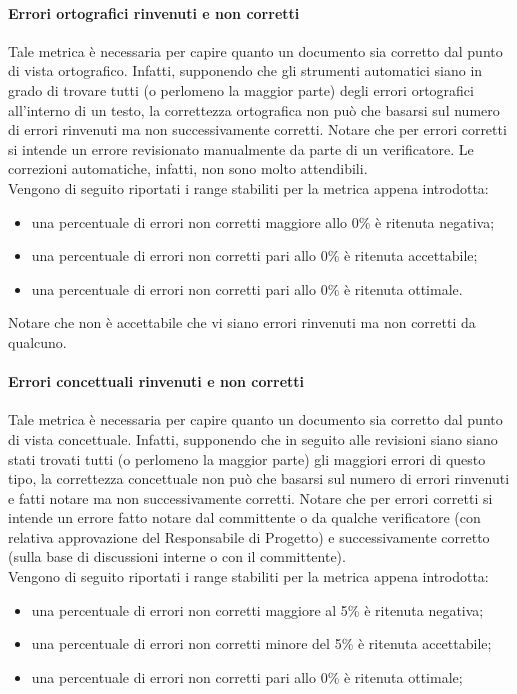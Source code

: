 \documentclass[../PianoDiQualifica.tex]{subfiles}
\begin{document}
				\paragraph{Errori ortografici rinvenuti e non corretti}
				Tale metrica è necessaria per capire quanto un documento sia corretto dal punto di vista ortografico. Infatti, supponendo che gli strumenti automatici siano in grado di trovare tutti (o perlomeno la maggior parte) degli errori ortografici all'interno di un testo, la correttezza ortografica non può che basarsi sul numero di errori rinvenuti ma non successivamente corretti. Notare che per errori corretti si intende un errore revisionato manualmente da parte di un verificatore. Le correzioni automatiche, infatti, non sono molto attendibili. \\
				Vengono di seguito riportati i range stabiliti per la metrica appena introdotta:
				\begin{itemize}
					\item una percentuale di errori non corretti maggiore allo 0\% è ritenuta negativa;
					\item una percentuale di errori non corretti pari allo 0\% è ritenuta accettabile;
					\item una percentuale di errori non corretti pari allo 0\% è ritenuta ottimale.
				\end{itemize}
				Notare che non è accettabile che vi siano errori rinvenuti ma non corretti da qualcuno.
				\paragraph{Errori concettuali rinvenuti e non corretti}
				Tale metrica è necessaria per capire quanto un documento sia corretto dal punto di vista concettuale. Infatti, supponendo che in seguito alle revisioni siano siano stati trovati tutti (o perlomeno la maggior parte) gli maggiori errori di questo tipo, la correttezza concettuale non può che basarsi sul numero di errori rinvenuti e fatti notare ma non successivamente corretti. Notare che per errori corretti si intende un errore fatto notare dal committente o da qualche verificatore (con relativa approvazione del Responsabile di Progetto) e successivamente corretto (sulla base di discussioni interne o con il committente).\\
				Vengono di seguito riportati i range stabiliti per la metrica appena introdotta:
				\begin{itemize}
					\item una percentuale di errori non corretti maggiore al 5\% è ritenuta negativa;
					\item una percentuale di errori non corretti minore del 5\% è ritenuta accettabile;
					\item una percentuale di errori non corretti pari allo 0\% è ritenuta ottimale;
				\end{itemize}	
\end{document}

